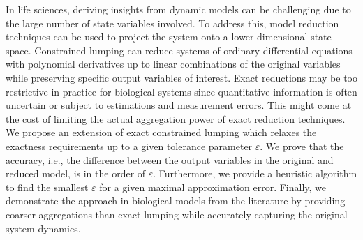 
In life sciences, deriving insights from dynamic models can be challenging due to the large number of state variables involved. To address this, model reduction techniques can be used to project the system onto a lower-dimensional state space.
Constrained lumping can reduce systems of ordinary differential equations with polynomial derivatives up to linear combinations of the original variables while preserving specific output variables of interest.
Exact reductions may be too restrictive in practice for biological systems since quantitative information is often uncertain or subject to estimations and measurement errors. This might come at the cost of limiting the actual aggregation power of exact reduction techniques.
We propose an extension of exact constrained lumping which relaxes the exactness requirements up to a given tolerance parameter $\varepsilon$. We prove that the accuracy, i.e., the difference between the output variables in the original and reduced model, is in the order of $\varepsilon$. Furthermore, we provide a heuristic algorithm to find the smallest $\varepsilon$ for a given maximal approximation error.
Finally, we demonstrate the approach in biological models from the literature by providing coarser aggregations than exact lumping while accurately capturing the original system dynamics.
